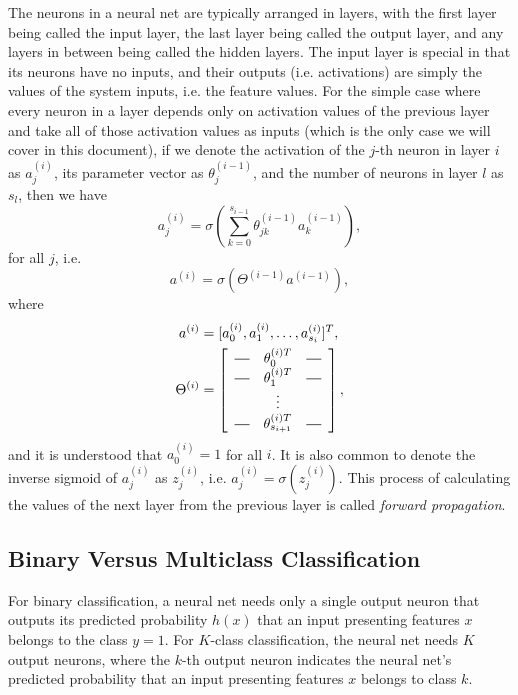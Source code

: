 \documentclass{article}
\newcommand*{\horzbar}{\rule[.5ex]{2.5ex}{0.5pt}}
\begin{document}
The neurons in a neural net are typically arranged in layers, with the first layer being called the input layer, the last layer being called the output layer, and any layers in between being called the hidden layers. The input layer is special in that its neurons have no inputs, and their outputs (i.e. activations) are simply the values of the system inputs, i.e. the feature values. For the simple case where every neuron in a layer depends only on activation values of the previous layer and take all of those activation values as inputs (which is the only case we will cover in this document), if we denote the activation of the $j$-th neuron in layer $i$ as $a_j^{(i)}$, its parameter vector as $\theta_j^{(i-1)}$, and the number of neurons in layer $l$ as $s_l$, then we have
$$a_j^{(i)} = \sigma\left(\sum_{k=0}^{s_{i-1}} \theta_{jk}^{(i-1)} a_k^{(i-1)}\right),$$
for all $j$, i.e.
$$a^{(i)} = \sigma\left(\Theta^{(i-1)}a^{(i-1)}\right),$$
where
\begin{align*}
a^{(i)} &= [a_0^{(i)}, a_1^{(i)}, \dots, a_{s_i}^{(i)}]^T,\\
\Theta^{(i)} &= \left[
\begin{array}{ccc}
\horzbar & \theta_0^{(i)T} & \horzbar \\
\horzbar & \theta_1^{(i)T} & \horzbar \\
& \vdots & \\
\horzbar & \theta_{s_{i+1}}^{(i)T} & \horzbar \\
\end{array}
\right],
\end{align*}
and it is understood that $a_0^{(i)} = 1$ for all $i$. It is also common to denote the inverse sigmoid of $a_j^{(i)}$ as $z_j^{(i)}$, i.e. $a_j^{(i)} = \sigma(z_j^{(i)}).$ This process of calculating the values of the next layer from the previous layer is called \emph{forward propagation}.

\subsection{Binary Versus Multiclass Classification}
For binary classification, a neural net needs only a single output neuron that outputs its predicted probability $h(x)$ that an input presenting features $x$ belongs to the class $y=1$. For $K$-class classification, the neural net needs $K$ output neurons, where the $k$-th output neuron indicates the neural net's predicted probability that an input presenting features $x$ belongs to class $k$.
\end{document}
